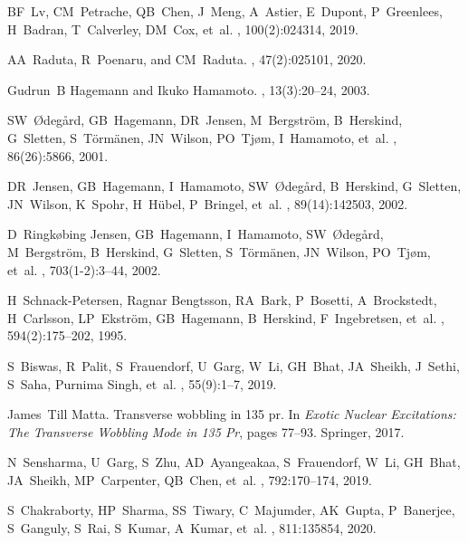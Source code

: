 \documentclass[myclassdoc,debug]{rjparticle}
\begin{document}
\begin{thebibliography}{99}
BF~Lv, CM~Petrache, QB~Chen, J~Meng, A~Astier, E~Dupont, P~Greenlees, H~Badran,
  T~Calverley, DM~Cox, et~al.
, 100(2):024314, 2019.

AA~Raduta, R~Poenaru, and CM~Raduta.
,
  47(2):025101, 2020.

Gudrun~B Hagemann and Ikuko Hamamoto.
, 13(3):20--24, 2003.

SW~{\O}deg{\aa}rd, GB~Hagemann, DR~Jensen, M~Bergstr{\"o}m, B~Herskind,
  G~Sletten, S~T{\"o}rm{\"a}nen, JN~Wilson, PO~Tj{\o}m, I~Hamamoto, et~al.
, 86(26):5866, 2001.

DR~Jensen, GB~Hagemann, I~Hamamoto, SW~{\O}deg{\aa}rd, B~Herskind, G~Sletten,
  JN~Wilson, K~Spohr, H~H{\"u}bel, P~Bringel, et~al.
, 89(14):142503, 2002.

D~Ringk{\o}bing Jensen, GB~Hagemann, I~Hamamoto, SW~{\O}deg{\aa}rd,
  M~Bergstr{\"o}m, B~Herskind, G~Sletten, S~T{\"o}rm{\"a}nen, JN~Wilson,
  PO~Tj{\o}m, et~al.
, 703(1-2):3--44, 2002.

H~Schnack-Petersen, Ragnar Bengtsson, RA~Bark, P~Bosetti, A~Brockstedt,
  H~Carlsson, LP~Ekstr{\"o}m, GB~Hagemann, B~Herskind, F~Ingebretsen, et~al.
, 594(2):175--202, 1995.

S~Biswas, R~Palit, S~Frauendorf, U~Garg, W~Li, GH~Bhat, JA~Sheikh, J~Sethi,
  S~Saha, Purnima Singh, et~al.
, 55(9):1--7, 2019.

James~Till Matta.
\newblock Transverse wobbling in 135 pr.
\newblock In {\em Exotic Nuclear Excitations: The Transverse Wobbling Mode in
  135 Pr}, pages 77--93. Springer, 2017.


N~Sensharma, U~Garg, S~Zhu, AD~Ayangeakaa, S~Frauendorf, W~Li, GH~Bhat,
  JA~Sheikh, MP~Carpenter, QB~Chen, et~al.
, 792:170--174, 2019.

S~Chakraborty, HP~Sharma, SS~Tiwary, C~Majumder, AK~Gupta, P~Banerjee,
  S~Ganguly, S~Rai, S~Kumar, A~Kumar, et~al.
, 811:135854, 2020.


\end{thebibliography}
\end{document}
